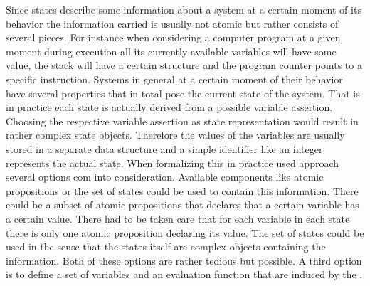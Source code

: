 \documentclass[preview]{standalone}
\begin{document}
Since states describe some information about a system at a certain moment of its behavior the information carried is usually not atomic but rather consists of several pieces. For instance when considering a computer program at a given moment during execution all its currently available variables will have some value, the stack will have a certain structure and the program counter points to a specific instruction. Systems in general at a certain moment of their behavior have several properties that in total pose the current state of the system. That is in practice each state is actually derived from a possible variable assertion. Choosing the respective variable assertion as state representation would result in rather complex state objects. Therefore the values of the variables are usually stored in a separate data structure and a simple identifier like an integer represents the actual state. When formalizing this in practice used approach several options com into consideration. Available \mdpN components like atomic propositions or the set of states could be used to contain this information. There could be a subset of atomic propositions that declares that a certain variable has a certain value. There had to be taken care that for each variable in each state there is only one atomic proposition declaring its value. The set of states could be used in the sense that the states itself are complex objects containing the information. Both of these options are rather tedious but possible. A third option is to define a set of variables and an evaluation function that are induced by the \mdpN.
\end{document}
